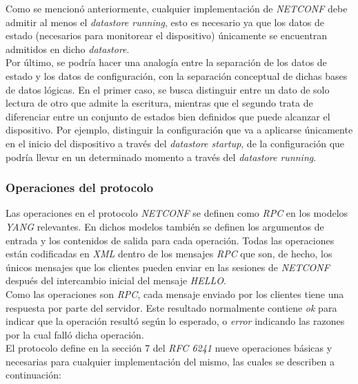 Como se mencionó anteriormente, cualquier implementación de \textit{NETCONF} debe admitir al menos el \textit{datastore running}, esto es necesario ya que los datos de estado (necesarios para monitorear el dispositivo) únicamente se encuentran admitidos en dicho \textit{datastore}.
\\

Por último, se podría hacer una analogía entre la separación de los datos de estado y los datos de configuración, con la separación conceptual de dichas bases de datos lógicas. 
En el primer caso, se busca distinguir entre un dato de solo lectura de otro que admite la escritura, mientras que el segundo trata de diferenciar entre un conjunto de estados bien definidos que puede alcanzar el dispositivo. Por ejemplo, distinguir la configuración que va a aplicarse únicamente en el inicio del dispositivo a través del \textit{datastore startup}, de la configuración que podría llevar en un determinado momento a través del \textit{datastore running}.


\subsubsection{Operaciones del protocolo}

Las operaciones en el protocolo \textit{NETCONF} se definen como \textit{RPC} en los modelos \textit{YANG} relevantes. En dichos modelos también se definen los argumentos de entrada y los contenidos de salida para cada operación. Todas las operaciones están codificadas en \textit{XML} dentro de los mensajes \textit{RPC} que son, de hecho, los únicos mensajes que los clientes pueden enviar en las sesiones de \textit{NETCONF} después del intercambio inicial del mensaje \textit{HELLO}. 
\\

Como las operaciones son \textit{RPC}, cada mensaje enviado por los clientes tiene una respuesta por parte del servidor. Este resultado normalmente contiene \textit{ok} para indicar que la operación resultó según lo esperado, o \textit{error} indicando las razones por la cual falló dicha operación.
\\

El protocolo define en la sección 7 del \textit{RFC 6241} nueve operaciones básicas y necesarias para cualquier implementación del mismo, las cuales se describen a continuación:

